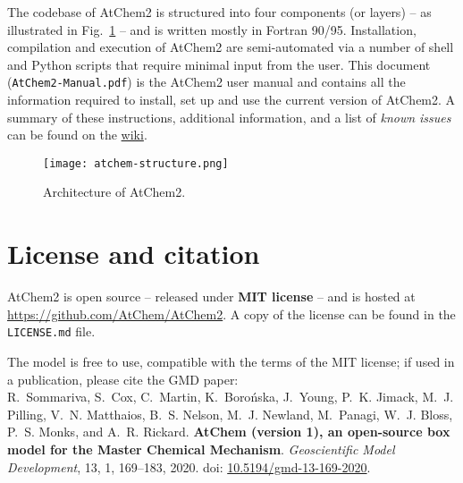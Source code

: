 The codebase of AtChem2 is structured into four components (or layers)
-- as illustrated in Fig.~\ref{fig:atchem-arch} -- and is written
mostly in Fortran 90/95.  Installation, compilation and execution of
AtChem2 are semi-automated via a number of shell and Python scripts
that require minimal input from the user. This document
(\texttt{AtChem2-Manual.pdf}) is the AtChem2 user manual and contains
all the information required to install, set up and use the current
version of AtChem2. A summary of these instructions, additional
information, and a list of \emph{known issues} can be found on the
\href{https://github.com/AtChem/AtChem2/wiki}{wiki}.

\begin{figure}[htb]
  \centering
  \texttt{[image: atchem-structure.png]}
  \caption{Architecture of AtChem2.}
  \label{fig:atchem-arch}
\end{figure}

\section{License and citation} \label{sec:license-citation}

AtChem2 is open source -- released under \textbf{MIT license} -- and is hosted
at \href{https://github.com/AtChem/AtChem2}{https://github.com/AtChem/AtChem2}.
A copy of the license can be found in the \texttt{LICENSE.md} file.

The model is free to use, compatible with the terms of the MIT
license; if used in a publication, please cite the GMD paper:\\

R.~Sommariva, S.~Cox, C.~Martin, K.~Boro{\'n}ska, J.~Young, P.~K. Jimack,
M.~J. Pilling, V.~N. Matthaios, B.~S. Nelson, M.~J. Newland, M.~Panagi,
W.~J. Bloss, P.~S. Monks, and A.~R. Rickard.
\textbf{AtChem (version 1), an open-source box model for the Master Chemical Mechanism}.
\textit{Geoscientific Model Development}, 13, 1, 169--183, 2020.
doi: \href{https://doi.org/10.5194/gmd-13-169-2020}{10.5194/gmd-13-169-2020}.
